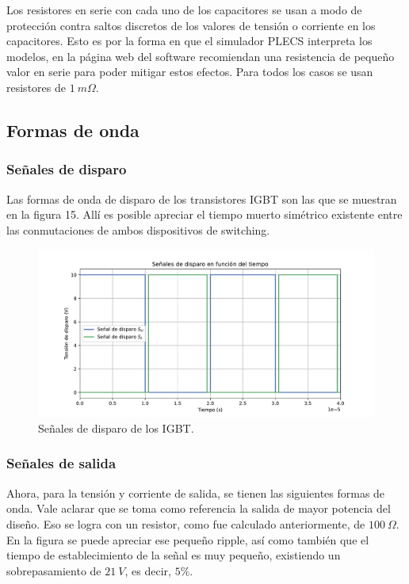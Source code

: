 Los resistores en serie con cada uno de los capacitores se usan a modo de protección contra saltos discretos de los valores de tensión o corriente en los capacitores. Esto es por la forma en que el simulador PLECS interpreta los modelos, en la página web del software recomiendan una resistencia de pequeño valor en serie para poder mitigar estos efectos. Para todos los casos se usan resistores de $1 \ m\Omega$.

\subsection{Formas de onda}

\subsubsection{Señales de disparo}

Las formas de onda de disparo de los transistores IGBT son las que se muestran en la figura 15. Allí es posible apreciar el tiempo muerto simétrico existente entre las conmutaciones de ambos dispositivos de switching.

\begin{figure}
	\centering
	\includegraphics[width=1\linewidth]{img/disparo}
	\caption{Señales de disparo de los IGBT.}
	\label{fig:disparo}
\end{figure}

\subsubsection{Señales de salida}

Ahora, para la tensión y corriente de salida, se tienen las siguientes formas de onda. Vale aclarar que se toma como referencia la salida de mayor potencia del diseño. Eso se logra con un resistor, como fue calculado anteriormente, de $100 \ \Omega$. En la figura se puede apreciar ese pequeño ripple, así como también que el tiempo de establecimiento de la señal es muy pequeño, existiendo un sobrepasamiento de $21 \ V$, es decir, $5\%$.

